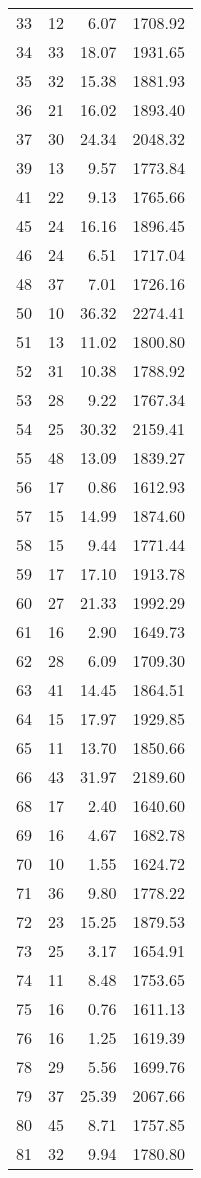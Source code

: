 \begin{appendix}
\begin{longtable}{rrrr}
33 & 12 & 6.07 & 1708.92 \\
34 & 33 & 18.07 & 1931.65 \\
35 & 32 & 15.38 & 1881.93 \\
36 & 21 & 16.02 & 1893.40 \\
37 & 30 & 24.34 & 2048.32 \\
39 & 13 & 9.57 & 1773.84 \\
41 & 22 & 9.13 & 1765.66 \\
45 & 24 & 16.16 & 1896.45 \\
46 & 24 & 6.51 & 1717.04 \\
48 & 37 & 7.01 & 1726.16 \\
50 & 10 & 36.32 & 2274.41 \\
51 & 13 & 11.02 & 1800.80 \\
52 & 31 & 10.38 & 1788.92 \\
53 & 28 & 9.22 & 1767.34 \\
54 & 25 & 30.32 & 2159.41 \\
55 & 48 & 13.09 & 1839.27 \\
56 & 17 & 0.86 & 1612.93 \\
57 & 15 & 14.99 & 1874.60 \\
58 & 15 & 9.44 & 1771.44 \\
59 & 17 & 17.10 & 1913.78 \\
60 & 27 & 21.33 & 1992.29 \\
61 & 16 & 2.90 & 1649.73 \\
62 & 28 & 6.09 & 1709.30 \\
63 & 41 & 14.45 & 1864.51 \\
64 & 15 & 17.97 & 1929.85 \\
65 & 11 & 13.70 & 1850.66 \\
66 & 43 & 31.97 & 2189.60 \\
68 & 17 & 2.40 & 1640.60 \\
69 & 16 & 4.67 & 1682.78 \\
70 & 10 & 1.55 & 1624.72 \\
71 & 36 & 9.80 & 1778.22 \\
72 & 23 & 15.25 & 1879.53 \\
73 & 25 & 3.17 & 1654.91 \\
74 & 11 & 8.48 & 1753.65 \\
75 & 16 & 0.76 & 1611.13 \\
76 & 16 & 1.25 & 1619.39 \\
78 & 29 & 5.56 & 1699.76 \\
79 & 37 & 25.39 & 2067.66 \\
80 & 45 & 8.71 & 1757.85 \\
81 & 32 & 9.94 & 1780.80 \\
\bottomrule
\end{longtable}


\end{appendix}
